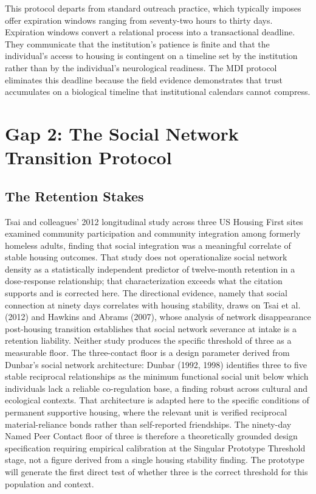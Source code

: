 \documentclass[12pt, letterpaper]{article}
\begin{document}
This protocol departs from standard outreach practice, which typically imposes offer expiration windows ranging from seventy-two hours to thirty days. Expiration windows convert a relational process into a transactional deadline. They communicate that the institution's patience is finite and that the individual's access to housing is contingent on a timeline set by the institution rather than by the individual's neurological readiness. The MDI protocol eliminates this deadline because the field evidence demonstrates that trust accumulates on a biological timeline that institutional calendars cannot compress.


\clearpage
\section{Gap 2: The Social Network Transition Protocol}

\subsection{The Retention Stakes}

Tsai and colleagues' 2012 longitudinal study across three US Housing First sites examined community participation and community integration among formerly homeless adults, finding that social integration was a meaningful correlate of stable housing outcomes. That study does not operationalize social network density as a statistically independent predictor of twelve-month retention in a dose-response relationship; that characterization exceeds what the citation supports and is corrected here. The directional evidence, namely that social connection at ninety days correlates with housing stability, draws on Tsai et al. (2012) and Hawkins and Abrams (2007), whose analysis of network disappearance post-housing transition establishes that social network severance at intake is a retention liability. Neither study produces the specific threshold of three as a measurable floor. The three-contact floor is a design parameter derived from Dunbar's social network architecture: Dunbar (1992, 1998) identifies three to five stable reciprocal relationships as the minimum functional social unit below which individuals lack a reliable co-regulation base, a finding robust across cultural and ecological contexts. That architecture is adapted here to the specific conditions of permanent supportive housing, where the relevant unit is verified reciprocal material-reliance bonds rather than self-reported friendships. The ninety-day Named Peer Contact floor of three is therefore a theoretically grounded design specification requiring empirical calibration at the Singular Prototype Threshold stage, not a figure derived from a single housing stability finding. The prototype will generate the first direct test of whether three is the correct threshold for this population and context.
\end{document}
